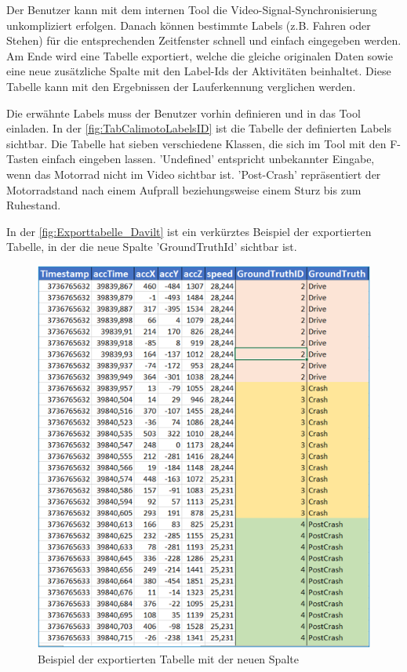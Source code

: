 Der Benutzer kann mit dem internen Tool die Video-Signal-Synchronisierung unkompliziert erfolgen. Danach können bestimmte Labels (z.B. Fahren oder Stehen) für die entsprechenden Zeitfenster schnell und einfach eingegeben werden. Am Ende wird eine Tabelle exportiert, welche die gleiche originalen Daten sowie eine neue zusätzliche Spalte mit den Label-Ids der Aktivitäten beinhaltet.
Diese Tabelle kann mit den Ergebnissen der Lauferkennung verglichen werden.

Die erwähnte Labels muss der Benutzer vorhin definieren und in das Tool einladen. In der \autoref{fig:TabCalimotoLabelsID} ist die Tabelle der definierten Labels sichtbar. Die Tabelle hat sieben verschiedene Klassen, die sich im Tool mit den F-Tasten einfach eingeben lassen. 'Undefined' entspricht unbekannter Eingabe, wenn das Motorrad nicht im Video sichtbar ist. 'Post-Crash' repräsentiert der Motorradstand nach einem Aufprall beziehungsweise einem Sturz bis zum Ruhestand.
 
In der \autoref{fig:Exporttabelle_Davilt} ist ein verkürztes Beispiel der exportierten Tabelle, in der die neue Spalte 'GroundTruthId' sichtbar ist.
\begin{figure}[H]
	\centering
	\includegraphics[width=\linewidth]{Bilder/Exporttabelle_Davilt.png}
	\caption{Beispiel der exportierten Tabelle mit der neuen Spalte}
	\label{fig:Exporttabelle_Davilt}
\end{figure}

